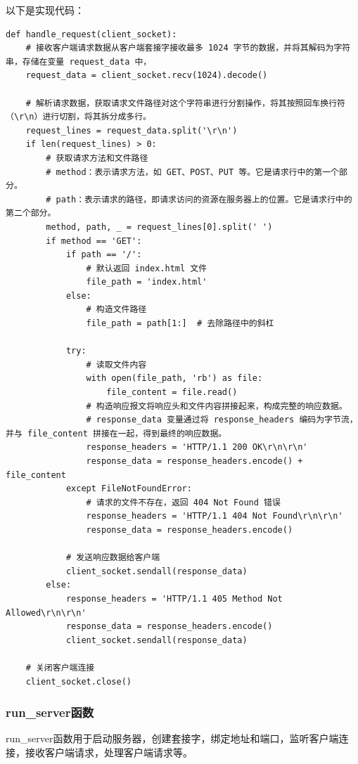 \documentclass[UTF8,12pt]{article}
\begin{document}
以下是实现代码：

\begin{lstlisting}[title=handle\_request函数,frame=shadowbox]
    def handle_request(client_socket):
    # 接收客户端请求数据从客户端套接字接收最多 1024 字节的数据，并将其解码为字符串，存储在变量 request_data 中，
    request_data = client_socket.recv(1024).decode()

    # 解析请求数据，获取请求文件路径对这个字符串进行分割操作，将其按照回车换行符（\r\n）进行切割，将其拆分成多行。
    request_lines = request_data.split('\r\n')
    if len(request_lines) > 0:
        # 获取请求方法和文件路径
        # method：表示请求方法，如 GET、POST、PUT 等。它是请求行中的第一个部分。
        # path：表示请求的路径，即请求访问的资源在服务器上的位置。它是请求行中的第二个部分。
        method, path, _ = request_lines[0].split(' ')
        if method == 'GET':
            if path == '/':
                # 默认返回 index.html 文件
                file_path = 'index.html'
            else:
                # 构造文件路径
                file_path = path[1:]  # 去除路径中的斜杠

            try:
                # 读取文件内容
                with open(file_path, 'rb') as file:
                    file_content = file.read()
                # 构造响应报文将响应头和文件内容拼接起来，构成完整的响应数据。
                # response_data 变量通过将 response_headers 编码为字节流，并与 file_content 拼接在一起，得到最终的响应数据。
                response_headers = 'HTTP/1.1 200 OK\r\n\r\n'
                response_data = response_headers.encode() + file_content
            except FileNotFoundError:
                # 请求的文件不存在，返回 404 Not Found 错误
                response_headers = 'HTTP/1.1 404 Not Found\r\n\r\n'
                response_data = response_headers.encode()

            # 发送响应数据给客户端
            client_socket.sendall(response_data)
        else:
            response_headers = 'HTTP/1.1 405 Method Not Allowed\r\n\r\n'
            response_data = response_headers.encode()
            client_socket.sendall(response_data)

    # 关闭客户端连接
    client_socket.close()
\end{lstlisting}

\subsubsection{run\_server函数}
run\_server函数用于启动服务器，创建套接字，绑定地址和端口，监听客户端连接，接收客户端请求，处理客户端请求等。
\end{document}
